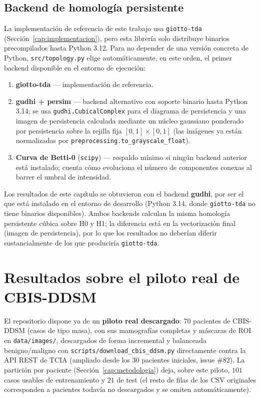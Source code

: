 \subsection{Backend de homología persistente}
\label{sec:backend-tda}
La implementación de referencia de este trabajo usa \texttt{giotto-tda}
(Sección~\ref{cap:implementacion}), pero esta librería solo distribuye
binarios precompilados hasta Python 3.12. Para no depender de una versión
concreta de Python, \texttt{src/topology.py} elige automáticamente, en este
orden, el primer backend disponible en el entorno de ejecución:
\begin{enumerate}
  \item \textbf{giotto-tda} --- implementación de referencia.
  \item \textbf{gudhi + persim} --- backend alternativo con soporte binario
        hasta Python 3.14; se usa \texttt{gudhi.CubicalComplex} para el
        diagrama de persistencia y una imagen de persistencia calculada
        mediante un núcleo gaussiano ponderado por persistencia sobre la
        rejilla fija $[0,1]\times[0,1]$ (las imágenes ya están normalizadas
        por \texttt{preprocessing.to\_grayscale\_float}).
  \item \textbf{Curva de Betti-0} (\texttt{scipy}) --- respaldo mínimo si
        ningún backend anterior está instalado; cuenta cómo evoluciona el
        número de componentes conexas al barrer el umbral de intensidad.
\end{enumerate}
Los resultados de este capítulo se obtuvieron con el backend \textbf{gudhi},
por ser el que está instalado en el entorno de desarrollo (Python 3.14, donde
\texttt{giotto-tda} no tiene binarios disponibles). Ambos backends calculan la
misma homología persistente cúbica sobre H0 y H1; la diferencia está en la
vectorización final (imagen de persistencia), por lo que los resultados no
deberían diferir sustancialmente de los que produciría \texttt{giotto-tda}.

\section{Resultados sobre el piloto real de CBIS-DDSM}
\label{sec:resultados-reales}

El repositorio dispone ya de un \textbf{piloto real descargado}:
70 pacientes de \mbox{CBIS-DDSM} (casos de tipo masa), con sus mamografías
completas y máscaras de ROI en \texttt{data/images/}, descargados de forma
incremental y balanceada benigno/maligno con
\texttt{scripts/download\_cbis\_ddsm.py} directamente contra la API REST de
TCIA (ampliado desde los 30 pacientes iniciales, issue \#82). La partición
por paciente (Sección~\ref{cap:metodologia}) deja, sobre este piloto, $101$
casos usables de entrenamiento y $21$ de test (el resto de filas de los CSV
originales corresponden a pacientes todavía no descargados y se omiten
automáticamente).

